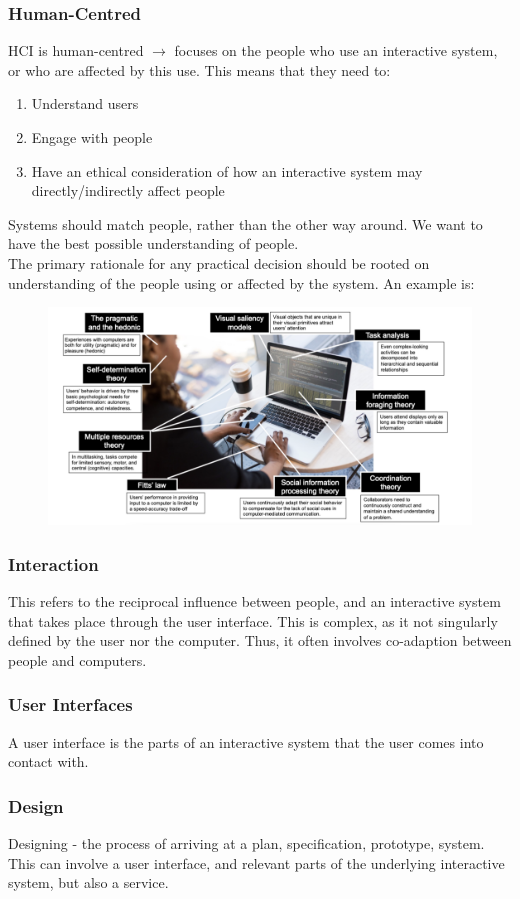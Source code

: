 \documentclass{article}
\begin{document}
\subsubsection{Human-Centred}
HCI is human-centred $\rightarrow$ focuses on the people who use an interactive system, or who are affected by this use. This means that they need to:
\begin{enumerate}
    \item Understand users
    \item Engage with people
    \item Have an ethical consideration of how an interactive system may directly/indirectly affect people
\end{enumerate}
Systems should match people, rather than the other way around. We want to have the best possible understanding of people. \\
The primary rationale for any practical decision should be rooted on understanding of the people using or affected by the system. An example is:
\begin{figure}[H]
    \centering
    \includegraphics[width=0.7\linewidth]{Pictures/Screenshot 2023-02-17 at 12.21.24.png}
\end{figure}
\subsubsection{Interaction}
This refers to the reciprocal influence between people, and an interactive system that takes place through the user interface. This is complex, as it not singularly defined by the user nor the computer. Thus, it often involves co-adaption between people and computers.
\subsubsection{User Interfaces}
A user interface is the parts of an interactive system that the user comes into contact with.
\subsubsection{Design}
Designing - the process of arriving at a plan, specification, prototype, system. This can involve a user interface, and relevant parts of the underlying interactive system, but also a service.
\end{document}
